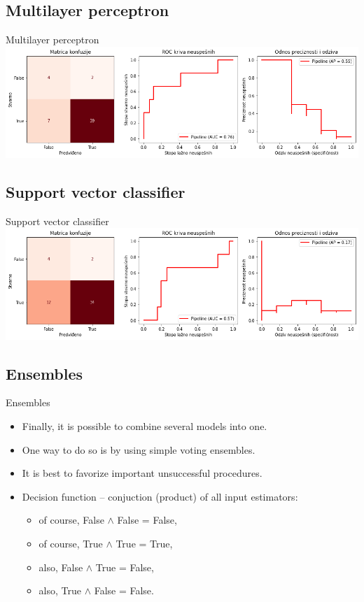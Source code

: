 \documentclass[hyperref={bookmarks=false}]{beamer}
\begin{document}
\subsection{Multilayer perceptron}
\begin{frame}{Multilayer perceptron}
\includegraphics[width=\textwidth]{mlp.png}
\end{frame}

\subsection{Support vector classifier}
\begin{frame}{Support vector classifier}
\includegraphics[width=\textwidth]{svc.png}
\end{frame}

\subsection{Ensembles}
\begin{frame}{Ensembles}
\begin{itemize}
    \item Finally, it is possible to combine several models into one.
    \item One way to do so is by using simple voting ensembles.
    \item It is best to favorize important unsuccessful procedures.
    \item Decision function -- conjuction (product) of all input estimators:
    \begin{itemize}
        \item of course, False $\wedge$ False = False,
        \item of course, True $\wedge$ True = True,
        \item also, False $\wedge$ True = False,
        \item also, True $\wedge$ False = False.
    \end{itemize}
\end{itemize}
\end{frame}
\end{document}
